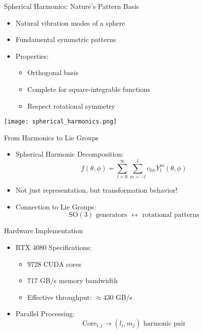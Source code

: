 \documentclass{beamer}
\begin{document}
\begin{frame}{Spherical Harmonics: Nature's Pattern Basis}
\begin{itemize}
\item Natural vibration modes of a sphere
\item Fundamental symmetric patterns
\item Properties:
\begin{itemize}
\item Orthogonal basis
\item Complete for square-integrable functions
\item Respect rotational symmetry
\end{itemize}
\end{itemize}
\begin{center}
\texttt{[image: spherical\_harmonics.png]}
\end{center}
\end{frame}
\begin{frame}{From Harmonics to Lie Groups}
\begin{itemize}
\item Spherical Harmonic Decomposition:
\begin{equation*}
f(\theta,\phi) = \sum_{l=0}^{\infty}\sum_{m=-l}^l c_{lm}Y_l^m(\theta,\phi)
\end{equation*}
\item Not just representation, but transformation behavior!
\pause
\item Connection to Lie Groups:
\begin{equation*}
\text{SO}(3) \text{ generators } \leftrightarrow \text{ rotational patterns}
\end{equation*}
\end{itemize}
\end{frame}
\begin{frame}{Hardware Implementation}
\begin{itemize}
\item RTX 4080 Specifications:
\begin{itemize}
\item 9728 CUDA cores
\item 717 GB/s memory bandwidth
\item Effective throughput: $\approx 430$ GB/s
\end{itemize}
\item Parallel Processing:
\begin{equation*}
\text{Core}_{i,j} \rightarrow (l_i,m_j) \text{ harmonic pair}
\end{equation*}
\end{itemize}
\end{frame}
\end{document}
